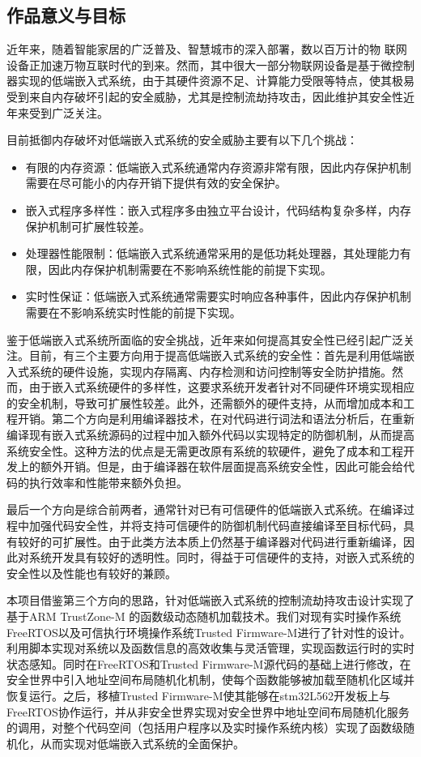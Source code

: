\documentclass[12pt,a4paper]{ctexart}
\numberwithin{figure}{section}
\begin{document}
\subsection{作品意义与目标}
\par 近年来，随着智能家居的广泛普及、智慧城市的深入部署，数以百万计的物 联网设备正加速万物互联时代的到来。然而，其中很大一部分物联网设备是基于微控制器实现的低端嵌入式系统，由于其硬件资源不足、计算能力受限等特点，使其极易受到来自内存破坏引起的安全威胁，尤其是控制流劫持攻击，因此维护其安全性近年来受到广泛关注。
\par 目前抵御内存破坏对低端嵌入式系统的安全威胁主要有以下几个挑战：
\begin{itemize}
    \item 有限的内存资源：低端嵌入式系统通常内存资源非常有限，因此内存保护机制需要在尽可能小的内存开销下提供有效的安全保护。
    \item 嵌入式程序多样性：嵌入式程序多由独立平台设计，代码结构复杂多样，内存保护机制可扩展性较差。
    \item 处理器性能限制：低端嵌入式系统通常采用的是低功耗处理器，其处理能力有限，因此内存保护机制需要在不影响系统性能的前提下实现。
    \item 实时性保证：低端嵌入式系统通常需要实时响应各种事件，因此内存保护机制需要在不影响系统实时性能的前提下实现。
\end{itemize}
\par 鉴于低端嵌入式系统所面临的安全挑战，近年来如何提高其安全性已经引起广泛关注。目前，有三个主要方向用于提高低端嵌入式系统的安全性：首先是利用低端嵌入式系统的硬件设施，实现内存隔离、内存检测和访问控制等安全防护措施。然而，由于嵌入式系统硬件的多样性，这要求系统开发者针对不同硬件环境实现相应的安全机制，导致可扩展性较差。此外，还需额外的硬件支持，从而增加成本和工程开销。第二个方向是利用编译器技术，在对代码进行词法和语法分析后，在重新编译现有嵌入式系统源码的过程中加入额外代码以实现特定的防御机制，从而提高系统安全性。这种方法的优点是无需更改原有系统的软硬件，避免了成本和工程开发上的额外开销。但是，由于编译器在软件层面提高系统安全性，因此可能会给代码的执行效率和性能带来额外负担。
\par 最后一个方向是综合前两者，通常针对已有可信硬件的低端嵌入式系统。在编译过程中加强代码安全性，并将支持可信硬件的防御机制代码直接编译至目标代码，具有较好的可扩展性。由于此类方法本质上仍然基于编译器对代码进行重新编译，因此对系统开发具有较好的透明性。同时，得益于可信硬件的支持，对嵌入式系统的安全性以及性能也有较好的兼顾。 
\par 本项目借鉴第三个方向的思路，针对低端嵌入式系统的控制流劫持攻击设计实现了基于ARM TrustZone-M 的函数级动态随机加载技术。我们对现有实时操作系统FreeRTOS以及可信执行环境操作系统Trusted Firmware-M进行了针对性的设计。利用脚本实现对系统以及函数信息的高效收集与灵活管理，实现函数运行时的实时状态感知。同时在FreeRTOS和Trusted Firmware-M源代码的基础上进行修改，在安全世界中引入地址空间布局随机化机制，使每个函数能够被加载至随机化区域并恢复运行。之后，移植Trusted Firmware-M使其能够在stm32L562开发板上与FreeRTOS协作运行，并从非安全世界实现对安全世界中地址空间布局随机化服务的调用，对整个代码空间（包括用户程序以及实时操作系统内核）实现了函数级随机化，从而实现对低端嵌入式系统的全面保护。
\end{document}
